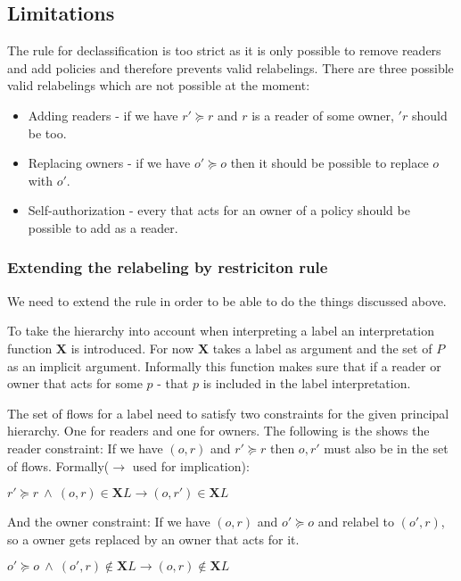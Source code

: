 \subsection{Limitations}
The rule for declassification is too strict as it is only possible to remove readers and add policies and therefore prevents valid relabelings.
There are three possible valid relabelings which are not possible at the moment:
\begin{itemize}
\item Adding readers - if we have $r' \succeq r$ and $r$ is a reader of some owner, $'r$ should be too.
\item Replacing owners - if we have $o' \succeq o$ then it should be possible to replace $o$ with $o'$.
\item Self-authorization - every \principal{} that acts for an owner of a policy should be possible to add as a reader.
\end{itemize}

\subsubsection{Extending the relabeling by restriciton rule}
We need to extend the rule in order to be able to do the things discussed above.

To take the \principal{} hierarchy into account when interpreting a label an interpretation function $\textbf{X}$ is introduced.
For now $\textbf{X}$ takes a label as argument and the set of \principals{} $P$ as an implicit argument.
Informally this function makes sure that if a reader or owner that acts for some \principal{} $p$ - that $p$ is included in the label interpretation.


The set of flows for a label need to satisfy two constraints for the given principal hierarchy.
One for readers and one for owners.
The following is the shows the reader constraint:
If we have $(o,r)$ and $r' \succeq r$ then $o,r'$ must also be in the set of flows.
Formally($\rightarrow$ used for implication):
\begin{center}
  $r' \succeq r \ \wedge \ (o,r) \in \textbf{X}L \rightarrow (o,r') \in \textbf{X}L$
\end{center}
And the owner constraint:
If we have $(o,r)$ and $o' \succeq o$ and relabel to $(o',r)$, so a owner gets replaced by an owner that acts for it.
\begin{center}
  $o' \succeq o \ \wedge \ (o',r) \notin \textbf{X}L \rightarrow (o,r) \notin \textbf{X}L$
\end{center}

